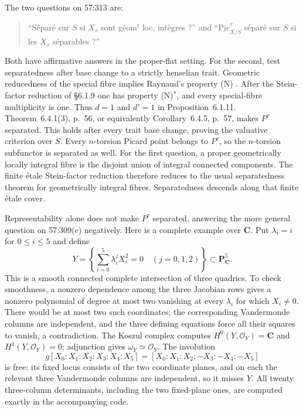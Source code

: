 The two questions on 57:313 are:
\begin{quote}
``S\'epar\'e sur $S$ si $X_s$ sont g\'eom$^t$ loc. int\`egres ?''
and ``$\underline{\mathrm{Pic}}^\tau_{X/S}$ s\'epar\'e sur $S$ si les $X_s$
s\'eparables ?''
\end{quote}
Both have affirmative answers in the proper-flat setting. For the second,
test separatedness after base change to a strictly henselian trait. Geometric
reducedness of the special fibre implies Raynaud's property (N)
\cite[Example~6.1.6, p.~49]{Raynaud1970}. After the Stein-factor reduction
of \S6.1.9 one has property (N)$^*$, and every special-fibre multiplicity is
one. Thus $d=1$ and $d'=1$ in Proposition~6.1.11. Theorem~6.4.1(3), p.~56,
or equivalently Corollary~6.4.5, p.~57, makes $P^\tau$ separated. This holds
after every trait base change, proving the valuative criterion over $S$.
Every $n$-torsion Picard point belongs to $P^\tau$, so the $n$-torsion
subfunctor is separated as well. For the first question, a proper geometrically
locally integral fibre is the disjoint union of integral connected components.
The finite \'etale Stein-factor reduction therefore reduces to the usual
separatedness theorem for geometrically integral fibres. Separatedness
descends along that finite \'etale cover.

Representability alone does not make $P^\tau$ separated, answering the more
general question on 57:309(e) negatively. Here is a complete example over
$\mathbf C$. Put $\lambda_i=i$ for $0\leq i\leq5$ and define
\[
 Y=\left\{\sum_{i=0}^5\lambda_i^jX_i^2=0\quad(j=0,1,2)\right\}
 \subset\mathbf P^5_{\mathbf C}.
\]
This is a smooth connected complete intersection of three quadrics. To check
smoothness, a nonzero dependence among the three Jacobian rows gives a nonzero
polynomial of degree at most two vanishing at every $\lambda_i$ for which
$X_i\ne0$. There would be at most two such coordinates; the corresponding
Vandermonde columns are independent, and the three defining equations force
all their squares to vanish, a contradiction. The Koszul complex computes
$H^0(Y,\mathcal O_Y)=\mathbf C$ and $H^1(Y,\mathcal O_Y)=0$; adjunction gives
$\omega_Y\simeq\mathcal O_Y$. The involution
\[
 g[X_0:X_1:X_2:X_3:X_4:X_5]
 =[X_0:X_1:X_2:-X_3:-X_4:-X_5]
\]
is free: its fixed locus consists of the two coordinate planes, and on each
the relevant three Vandermonde columns are independent, so it misses $Y$.
All twenty three-column determinants, including the two fixed-plane ones,
are computed exactly in the accompanying code.

